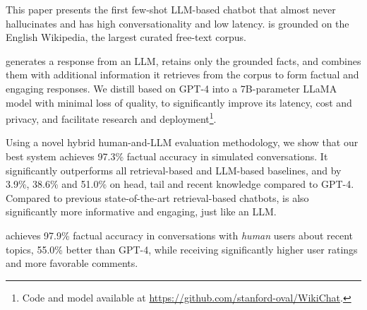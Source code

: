 This paper presents the first few-shot LLM-based chatbot that almost never hallucinates and has high conversationality and low latency. \system is grounded on the English Wikipedia, the largest curated free-text corpus.

\system generates a response from an LLM, retains only the grounded facts, and combines them with additional information it retrieves from the corpus to form factual and engaging responses. We distill \system based on GPT-4 into a 7B-parameter LLaMA model with minimal loss of quality, to significantly improve its latency, cost and privacy, and facilitate research and deployment\footnote{Code and model available at \url{https://github.com/stanford-oval/WikiChat}.}.

Using a novel hybrid human-and-LLM evaluation methodology, we show that our best system achieves 97.3\% factual accuracy in simulated conversations. It significantly outperforms all retrieval-based and LLM-based baselines, and by 3.9\%, 38.6\% and 51.0\% on head, tail and recent knowledge compared to GPT-4. Compared to previous state-of-the-art retrieval-based chatbots, \system 
is also significantly more informative and engaging, just like an LLM.  

\system achieves 97.9\% factual accuracy in conversations with \emph{human} users about recent topics, 55.0\% better than GPT-4, while receiving significantly higher user ratings and more favorable comments.
